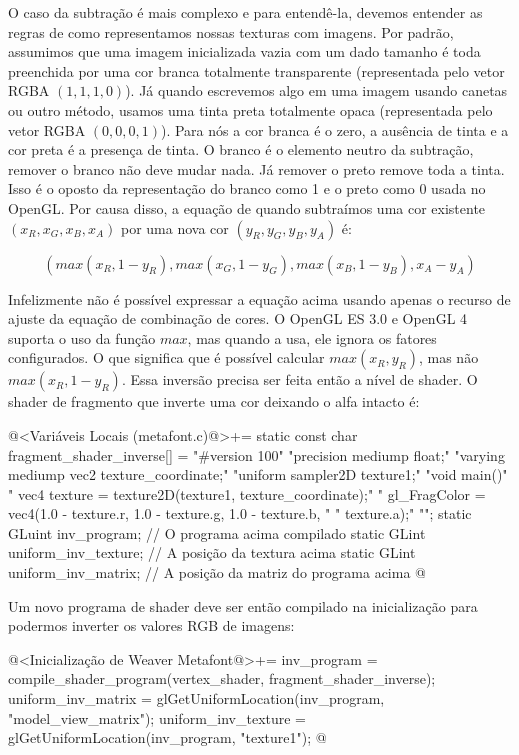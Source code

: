 {O caso da subtração é mais complexo e para entendê-la, devemos
entender as regras de como representamos nossas texturas com
imagens. Por padrão, assumimos que uma imagem inicializada vazia com
um dado tamanho é toda preenchida por uma cor branca totalmente
transparente (representada pelo vetor RGBA $(1, 1, 1, 0)$). Já quando
escrevemos algo em uma imagem usando canetas ou outro método, usamos
uma tinta preta totalmente opaca (representada pelo vetor RGBA $(0, 0,
0, 1)$). Para nós a cor branca é o zero, a ausência de tinta e a cor
preta é a presença de tinta. O branco é o elemento neutro da
subtração, remover o branco não deve mudar nada. Já remover o preto
remove toda a tinta. Isso é o oposto da representação do branco como 1
e o preto como 0 usada no OpenGL. Por causa disso, a equação de quando
subtraímos uma cor existente $(x_R, x_G, x_B, x_A)$ por uma nova cor
$(y_R, y_G, y_B, y_A)$ é:

$$
(max(x_R, 1-y_R), max(x_G, 1-y_G), max(x_B, 1-y_B), x_A-y_A)
$$

Infelizmente não é possível expressar a equação acima usando apenas o
recurso de ajuste da equação de combinação de cores. O OpenGL ES 3.0 e
OpenGL 4 suporta o uso da função $max$, mas quando a usa, ele ignora
os fatores configurados. O que significa que é possível calcular
$max(x_R, y_R)$, mas não $max(x_R, 1- y_R)$. Essa inversão precisa ser
feita então a nível de shader. O shader de fragmento que inverte uma
cor deixando o alfa intacto é:

\iniciocodigo
@<Variáveis Locais (metafont.c)@>+=
static const char fragment_shader_inverse[] =
  "#version 100\n"
  "precision mediump float;\n"
  "varying mediump vec2 texture_coordinate;\n"
  "uniform sampler2D texture1;\n"
  "void main(){\n"
  "  vec4 texture = texture2D(texture1, texture_coordinate);\n"
  "  gl_FragColor = vec4(1.0 - texture.r, 1.0 - texture.g, 1.0 - texture.b, \n"
  "                      texture.a);\n"
  "}\n";
static GLuint inv_program; // O programa acima compilado
static GLint uniform_inv_texture; // A posição da textura acima
static GLint uniform_inv_matrix; // A posição da matriz do programa acima
@
\fimcodigo

Um novo programa de shader deve ser então compilado na inicialização
para podermos inverter os valores RGB de imagens:

\iniciocodigo
@<Inicialização de Weaver Metafont@>+=
{
  inv_program = compile_shader_program(vertex_shader, fragment_shader_inverse);
  uniform_inv_matrix = glGetUniformLocation(inv_program, "model_view_matrix");
  uniform_inv_texture = glGetUniformLocation(inv_program, "texture1");
}
@
\fimcodigo

}
